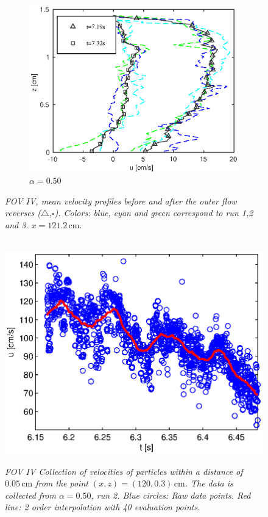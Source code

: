 \documentclass[review, authoryear]{elsarticle}
\newcommand{\cm}{\,\mbox{cm}}
\begin{document}
\begin{figure}[]
{\begin{subfigure}[b]{.3\textwidth}
\includegraphics[width=.95\textwidth]{./Figures/FOV_6/PIV_FOV6_case50.eps}
\caption{\textit{$\alpha=0.50$}}
\end{subfigure}%
}
\caption{\textit{FOV IV, mean velocity profiles before and after the outer flow reverses ($\triangle$,$\square$). Colors: blue, cyan and green correspond to run 1,2 and 3. 
$x=121.2\cm$}. }
\label{fig:PIV_FOV6}
\end{figure}
\begin{figure}[]
        \centering
        ~ %
                \includegraphics[scale=0.6]{./Figures/tid_case50_run2.eps}
                \caption{\textit{FOV IV Collection of velocities of particles within a distance of $0.05\cm$ from the point $(x,z)=(120,0.3)\cm$. The data is collected from  $\alpha=0.50$, run 2. Blue circles: Raw data points. Red line: 2 order interpolation with 40 evaluation points}.}
                \label{fig:wave_in_time}
        \end{figure}      
\end{document}
